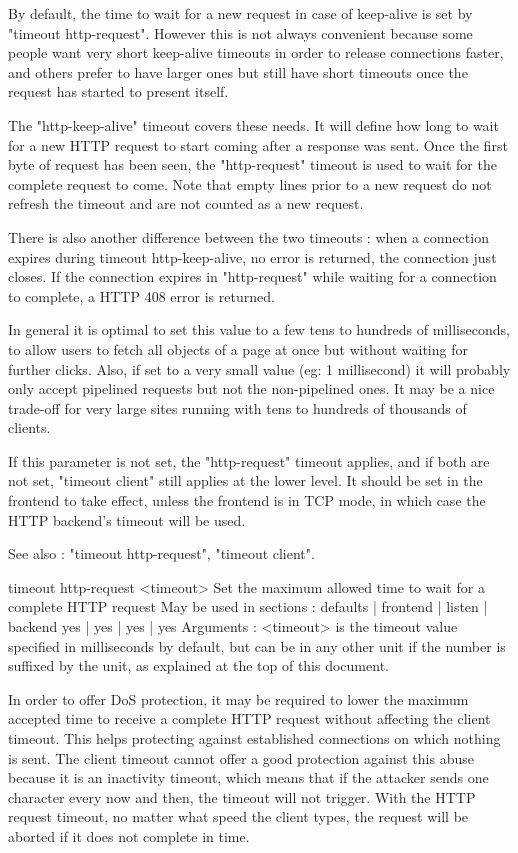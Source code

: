   By default, the time to wait for a new request in case of keep-alive is set
  by "timeout http-request". However this is not always convenient because some
  people want very short keep-alive timeouts in order to release connections
  faster, and others prefer to have larger ones but still have short timeouts
  once the request has started to present itself.

  The "http-keep-alive" timeout covers these needs. It will define how long to
  wait for a new HTTP request to start coming after a response was sent. Once
  the first byte of request has been seen, the "http-request" timeout is used
  to wait for the complete request to come. Note that empty lines prior to a
  new request do not refresh the timeout and are not counted as a new request.

  There is also another difference between the two timeouts : when a connection
  expires during timeout http-keep-alive, no error is returned, the connection
  just closes. If the connection expires in "http-request" while waiting for a
  connection to complete, a HTTP 408 error is returned.

  In general it is optimal to set this value to a few tens to hundreds of
  milliseconds, to allow users to fetch all objects of a page at once but
  without waiting for further clicks. Also, if set to a very small value (eg:
  1 millisecond) it will probably only accept pipelined requests but not the
  non-pipelined ones. It may be a nice trade-off for very large sites running
  with tens to hundreds of thousands of clients.

  If this parameter is not set, the "http-request" timeout applies, and if both
  are not set, "timeout client" still applies at the lower level. It should be
  set in the frontend to take effect, unless the frontend is in TCP mode, in
  which case the HTTP backend's timeout will be used.

  See also : "timeout http-request", "timeout client".


timeout http-request <timeout>
  Set the maximum allowed time to wait for a complete HTTP request
  May be used in sections :   defaults | frontend | listen | backend
                                 yes   |    yes   |   yes  |   yes
  Arguments :
    <timeout> is the timeout value specified in milliseconds by default, but
              can be in any other unit if the number is suffixed by the unit,
              as explained at the top of this document.

  In order to offer DoS protection, it may be required to lower the maximum
  accepted time to receive a complete HTTP request without affecting the client
  timeout. This helps protecting against established connections on which
  nothing is sent. The client timeout cannot offer a good protection against
  this abuse because it is an inactivity timeout, which means that if the
  attacker sends one character every now and then, the timeout will not
  trigger. With the HTTP request timeout, no matter what speed the client
  types, the request will be aborted if it does not complete in time.

